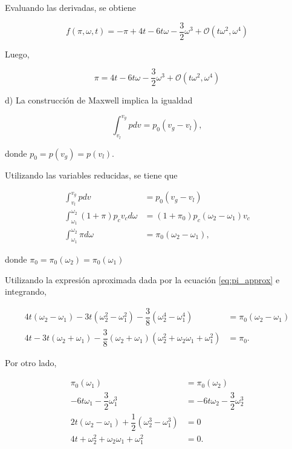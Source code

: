 \documentclass[10pt]{article}
\begin{document}
Evaluando las derivadas, se obtiene

\begin{equation}
f(\pi, \omega, t) = -\pi + 4t -6t\omega -\dfrac{3}{2}\omega^3 + \mathcal{O}(t\omega^2, \omega^4)
\end{equation}

Luego,

\begin{equation}\label{eq:pi_approx}
\pi = 4t -6t\omega -\dfrac{3}{2}\omega^3  + \mathcal{O}(t\omega^2, \omega^4)
\end{equation}

d) La construcci\'on de Maxwell implica la igualdad

\begin{equation}
\int_{v_l}^{v_g} p dv = p_0 (v_g - v_l),
\end{equation}

donde $p_0 = p(v_g) = p(v_l)$.

Utilizando las variables reducidas, se tiene que 

\begin{align}
\int_{v_l}^{v_g} p dv &= p_0 (v_g - v_l) \\
\int_{\omega_1}^{\omega_2} (1+\pi) p_c v_c d\omega &= (1+\pi_0) p_c (\omega_2 - \omega_1) v_c \\
\int_{\omega_1}^{\omega_2} \pi d\omega &= \pi_0 (\omega_2 - \omega_1),
\end{align}

donde $\pi_0 = \pi_0(\omega_2) = \pi_0(\omega_1)$

Utilizando la expresi\'on aproximada dada por la ecuaci\'on \ref{eq:pi_approx} e integrando,

\begin{align}
4t(\omega_2 - \omega_1) - 3t(\omega_2^2 - \omega_1^2) - \dfrac{3}{8} (\omega_2^4- \omega_1^4) &= \pi_0 (\omega_2 - \omega_1) \nonumber \\
4t - 3t(\omega_2 + \omega_1) - \dfrac{3}{8} (\omega_2 + \omega_1) (\omega_2^2 + \omega_2 \omega_1 + \omega_1^2) &= \pi_0. \label{eq:maxwell_integrated}
\end{align}

Por otro lado,

\begin{align}
\pi_0(\omega_1) &= \pi_0(\omega_2) \nonumber \\
 -6t\omega_1 - \dfrac{3}{2}\omega_1^3 &= -6t\omega_2 - \dfrac{3}{2}\omega_2^3 \nonumber \\
 2t(\omega_2 - \omega_1) + \dfrac{1}{2} (\omega_2^3-\omega_1^3 ) &= 0\nonumber \\
  4t + \omega_2^2+\omega_2  \omega_1 + \omega_1^2 &= 0. \label{eq:4t_equal_omegas}
\end{align}
\end{document}
